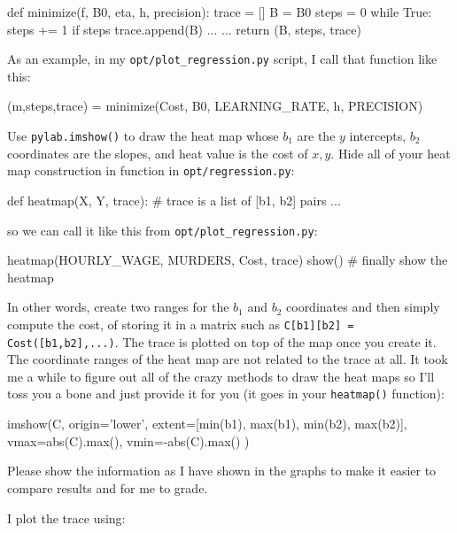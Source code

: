 \begin{fullwidth}
\begin{pyverbatim}
def minimize(f, B0, eta, h, precision):
    trace = []
    B = B0
    steps = 0 
    while True:
        steps += 1
        if steps %
            trace.append(B)
        ...     
    ... 
    return (B, steps, trace)
\end{pyverbatim}

As an example, in my {\tt opt/plot\_regression.py} script, I call that function like this:

\begin{pyverbatim}
(m,steps,trace) = minimize(Cost, B0, LEARNING_RATE, h, PRECISION)
\end{pyverbatim}

Use {\tt pylab.imshow()} to draw the heat map whose $b_1$ are the $y$ intercepts, $b_2$ coordinates are the slopes, and heat value is the cost of $x,y$.  Hide all of your heat map construction in function in {\tt opt/regression.py}:

\begin{pyverbatim}
def heatmap(X, Y, trace): # trace is a list of [b1, b2] pairs
    ...
\end{pyverbatim}

so we can call it like this from {\tt opt/plot\_regression.py}:

\begin{pyverbatim}
heatmap(HOURLY_WAGE, MURDERS, Cost, trace)
show() # finally show the heatmap
\end{pyverbatim}

In other words, create two ranges for the $b_1$ and $b_2$ coordinates and then simply compute the cost, of storing it in a matrix such as {\tt C[b1][b2] = Cost([b1,b2],...)}.  The trace is plotted on top of the map once you create it. The coordinate ranges of the heat map are not related to the trace at all. It took me a while to figure out all of the crazy methods to draw the heat maps so I'll toss you a bone and just provide it for you (it goes in your {\tt heatmap()} function):

\begin{pyverbatim}
	imshow(C,
		   origin='lower',
		   extent=[min(b1), max(b1), min(b2), max(b2)],
		   vmax=abs(C).max(), vmin=-abs(C).max()
	)
\end{pyverbatim}

Please show the information as I have shown in the graphs to make it easier to compare results and for me to grade. 

\noindent I plot the trace using:


\end{fullwidth}
